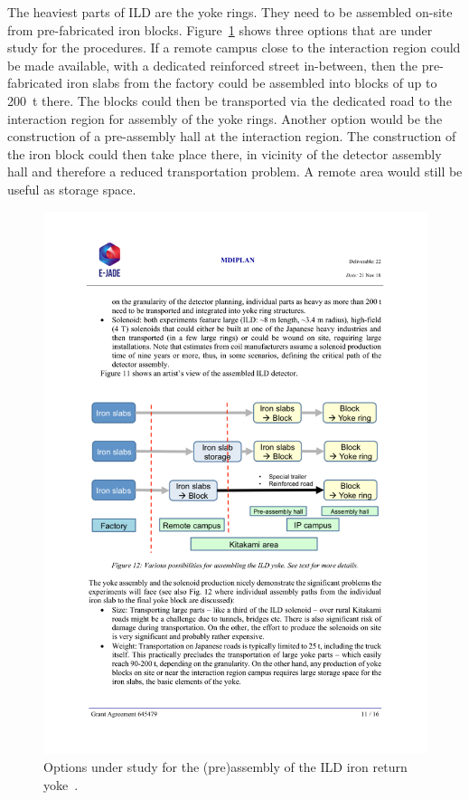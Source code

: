 The heaviest parts of ILD are the yoke rings. They need to be assembled on-site from pre-fabricated iron blocks. Figure~\ref{fig:integration:yoke_assembly} shows three options that are under study for the procedures. If a remote campus close to the interaction region could be made available, with a dedicated reinforced street in-between, then the pre-fabricated iron slabs from the factory could be assembled into blocks of up to 200~t there. The blocks could then be transported via the dedicated road to the interaction region for assembly of the yoke rings. Another option would be the construction of a pre-assembly hall at the interaction region. The construction of the iron block could then take place there, in vicinity of the detector assembly hall and therefore a reduced transportation problem. A remote area would still be useful as storage space.
\begin{figure}[h!]
\centering
\includegraphics[width=0.8\hsize]{Integration/fig/yoke_assembly.pdf}
\caption{\label{fig:integration:yoke_assembly}Options under study for the (pre)assembly of the ILD iron return yoke~\cite{ild:bib:ejade_mdi}.}
\end{figure}

